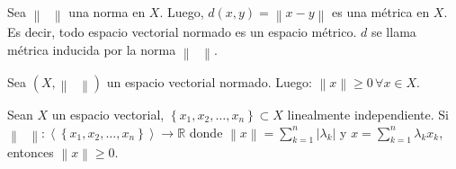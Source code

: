 \begin{prob}
    \label{prob4}
    Sea
    \begin{math}
        \left\|
        \phantom{\cdot}
        \right\|
    \end{math}
    una norma en $X$.
    Luego,
    \begin{math}
        d\left(x,y\right)=
        \left\|
        x-y
        \right\|
    \end{math}
    es una métrica en $X$.
    Es decir, todo espacio vectorial normado es un espacio
    métrico.
    $d$ se llama métrica inducida por la norma
    \begin{math}
        \left\|
        \phantom{\cdot}
        \right\|
    \end{math}.
\end{prob}


\begin{prob}
    \label{prob5}
    Sea
    \begin{math}
        \left(
        X,
        \left\|
        \phantom{\cdot}
        \right\|
        \right)
    \end{math}
    un espacio vectorial normado.
    Luego:
    \begin{math}
        \left\|
        x
        \right\|\geq
        0\,\forall
        x\in X
    \end{math}.
\end{prob}

\begin{prob}
    \label{prob6}
    Sean $X$ un espacio vectorial,
    \begin{math}
        \left\{
        x_{1},
        x_{2},
        \dotsc,
        x_{n}
        \right\}\subset
        X
    \end{math}
    linealmente independiente.
    Si
    \begin{math}
        \left\|
        \phantom{\cdot}
        \right\|\colon
        \left\langle
        \left\{
        x_{1},
        x_{2},
        \dotsc,
        x_{n}
        \right\}
        \right\rangle\to
        \mathbb{R}
    \end{math}
    donde
    \begin{math}
        \left\|
        x
        \right\|=
        \sum_{k=1}^{n}
        \left|
        \lambda_{k}
        \right|
    \end{math}
    y
    \begin{math}
        x=
        \sum_{k=1}^{n}
        \lambda_{k}x_{k}
    \end{math},
    entonces
    \begin{math}
        \left\|
        x
        \right\|\geq
        0
    \end{math}.
\end{prob}

